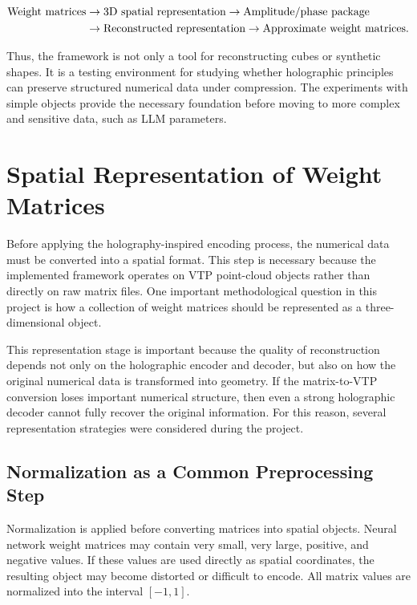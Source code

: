 \documentclass{article}
\begin{document}
\begin{normalsize}
\[
\begin{aligned}
\textnormal{Weight matrices}
&\rightarrow \textnormal{3D spatial representation}
\rightarrow \textnormal{Amplitude/phase package} \\
&\rightarrow \textnormal{Reconstructed representation}
\rightarrow \textnormal{Approximate weight matrices}.
\end{aligned}
\]

Thus, the framework is not only a tool for reconstructing cubes or synthetic shapes. It is a testing environment for studying whether holographic principles can preserve structured numerical data under compression. The experiments with simple objects provide the necessary foundation before moving to more complex and sensitive data, such as LLM parameters.

\section{Spatial Representation of Weight Matrices}

Before applying the holography-inspired encoding process, the numerical data must be converted into a spatial format. This step is necessary because the implemented framework operates on VTP point-cloud objects rather than directly on raw matrix files. One important methodological question in this project is how a collection of weight matrices should be represented as a three-dimensional object.

This representation stage is important because the quality of reconstruction depends not only on the holographic encoder and decoder, but also on how the original numerical data is transformed into geometry. If the matrix-to-VTP conversion loses important numerical structure, then even a strong holographic decoder cannot fully recover the original information. For this reason, several representation strategies were considered during the project.

\subsection{Normalization as a Common Preprocessing Step}

Normalization is applied before converting matrices into spatial objects. Neural network weight matrices may contain very small, very large, positive, and negative values. If these values are used directly as spatial coordinates, the resulting object may become distorted or difficult to encode. All matrix values are normalized into the interval \([-1,1]\).


\end{normalsize}
\end{document}
